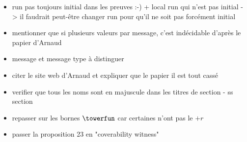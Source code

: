 \begin{itemize}
    \item run pas toujours initial dans les preuves :-) + local run qui n'est pas initial -> il faudrait peut-être changer run pour qu'il ne soit pas forcément initial
    \item mentionner que si plusieurs valeurs par message, c'est indécidable d'après le papier d'Arnaud
    \item message et message type à distinguer 
    \item citer le site web d'Arnaud et expliquer que le papier il est tout cassé
    \item verifier que tous les noms sont en majuscule dans les titres de section - ss section
    \item repasser sur les bornes $\towerfun$ car certaines n'ont pas le $+r$
    \item passer la proposition 23 en "coverability witness"
\end{itemize}
